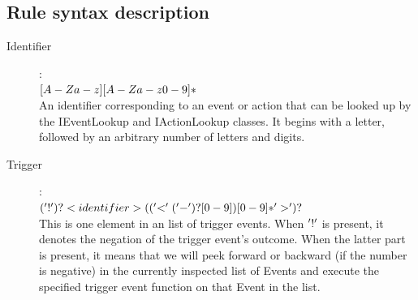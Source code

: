 \documentclass[a4paper,11pt]{report}
\begin{document}
		\subsection{Rule syntax description}\label{pauselocmarkerrulesyntax}
		\begin{description}
			\item[Identifier]:\\
				$[A-Za-z][A-Za-z0-9]*$\\
				An identifier corresponding to an event or action that can be looked up by the IEventLookup and IActionLookup classes. It begins with a letter, followed by an arbitrary number of letters and digits.
			\item[Trigger]:\\
				$('!')? <identifier> (('<' ('-')?[0-9])[0-9]* '>')?$\\
				This is one element in an list of trigger events. When $'!'$ is present, it denotes the negation of the trigger event's outcome. When the latter part is present, it means that we will peek forward or backward (if the number is negative) in the currently inspected list of Events and execute the specified trigger event function on that Event in the list.
			

\end{description}
\end{document}
